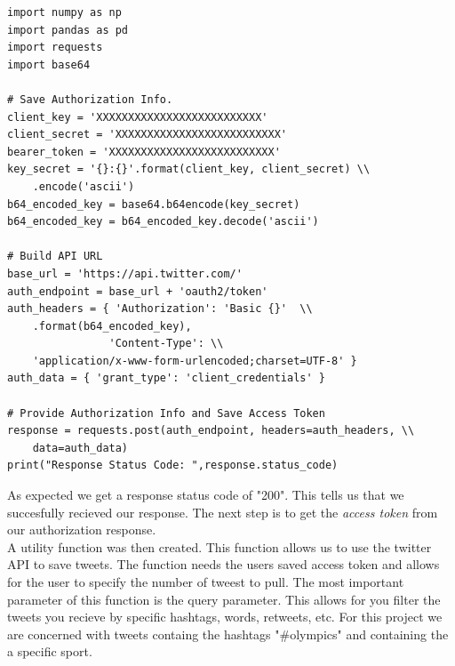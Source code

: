 \documentclass[12pt]{article}
\begin{document}
            \begin{lstlisting}[caption=Authorization]
import numpy as np
import pandas as pd
import requests 
import base64

# Save Authorization Info.
client_key = 'XXXXXXXXXXXXXXXXXXXXXXXXXX' 
client_secret = 'XXXXXXXXXXXXXXXXXXXXXXXXXX' 
bearer_token = 'XXXXXXXXXXXXXXXXXXXXXXXXXX' 
key_secret = '{}:{}'.format(client_key, client_secret) \\
    .encode('ascii')
b64_encoded_key = base64.b64encode(key_secret)
b64_encoded_key = b64_encoded_key.decode('ascii')

# Build API URL 
base_url = 'https://api.twitter.com/'
auth_endpoint = base_url + 'oauth2/token'
auth_headers = { 'Authorization': 'Basic {}'  \\
    .format(b64_encoded_key),
                'Content-Type': \\
    'application/x-www-form-urlencoded;charset=UTF-8' }
auth_data = { 'grant_type': 'client_credentials' }

# Provide Authorization Info and Save Access Token
response = requests.post(auth_endpoint, headers=auth_headers, \\
    data=auth_data)
print("Response Status Code: ",response.status_code)
            \end{lstlisting}

            As expected we get a response status code of "200". This tells us that we succesfully recieved our response. The next step is to get the \textit{access token} from our 
            authorization response. \\

            A utility function was then created. This function allows us to use the twitter API to save tweets. The function needs the users saved access token and allows for the user 
            to specify the number of tweest to pull. The most important parameter of this function is the query parameter. This allows for you filter the tweets you recieve by specific 
            hashtags, words, retweets, etc. For this project we are concerned with tweets containg the hashtags "\#olympics" and containing the a specific sport.
\end{document}
